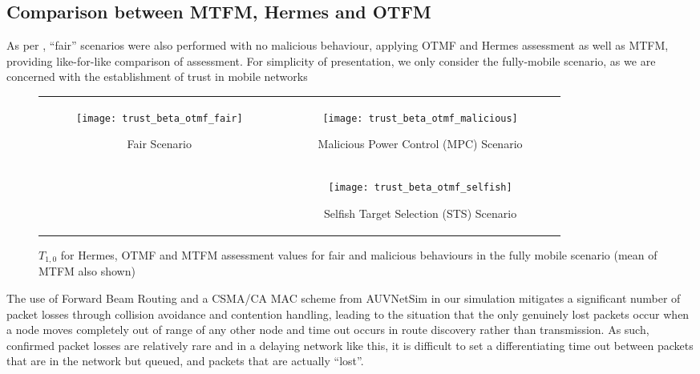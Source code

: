\subsection{Comparison between MTFM, Hermes and OTFM}
As per \cite{Guo11}, ``fair'' scenarios were also performed with no malicious behaviour, applying OTMF and Hermes assessment as well as MTFM, providing like-for-like comparison of assessment.
For simplicity of presentation, we only consider the fully-mobile scenario, as we are concerned with the establishment of trust in mobile networks

\begin{figure*}[t]
  \centering
  \begin{tabular}{cc}
  \multirow{2}{*}{
  \begin{subfigure}{0.5\textwidth}	
    \texttt{[image: trust\_beta\_otmf\_fair]}
    \caption{Fair Scenario}
    \label{fig:all_mobile_fair_beta}
  \end{subfigure}
  }&
  \begin{subfigure}{0.5\textwidth}
    \texttt{[image: trust\_beta\_otmf\_malicious]} 
    \caption{Malicious Power Control (MPC) Scenario}
    \label{fig:all_mobile_badmouthing_beta}
  \end{subfigure} \\
  &
  \begin{subfigure}{0.5\textwidth}	
    \texttt{[image: trust\_beta\_otmf\_selfish]} 
    \caption{Selfish Target Selection (STS) Scenario}
    \label{fig:all_mobile_selfish_beta}
  \end{subfigure}
\end{tabular}
  \caption{$T_{1,0}$ for Hermes, OTMF and MTFM assessment values for fair and malicious behaviours in the fully mobile scenario (mean of MTFM also shown)}
  \label{fig:otmf_beta_comparison}
\end{figure*}
%
The use of Forward Beam Routing and a CSMA/CA MAC scheme from AUVNetSim \cite{Miquel2008} in our simulation mitigates a significant number of packet losses through collision avoidance and contention handling, leading to the situation that the only genuinely lost packets occur when a node moves completely out of range of any other node and time out occurs in route discovery rather than transmission.
As such, confirmed packet losses are relatively rare and in a delaying network like this, it is difficult to set a differentiating time out between packets that are in the network but queued, and packets that are actually ``lost''.

